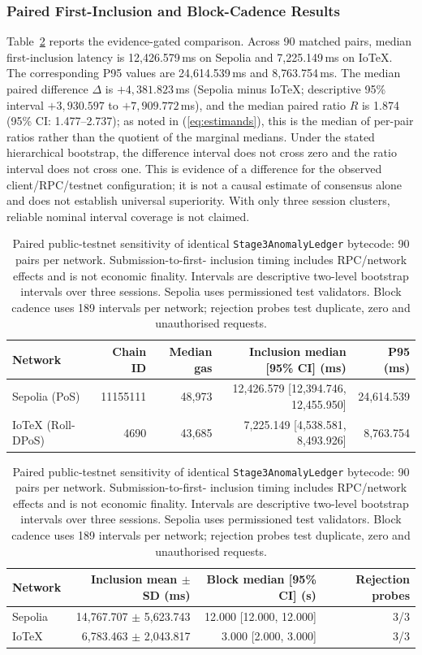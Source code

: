 \documentclass[journal]{IEEEtran}
\newif\ifshowrevisions
\newcommand{\rev}[1]{{\ifshowrevisions\color{blue}\else\color{black}\fi #1}}
\begin{document}
\subsubsection{Paired First-Inclusion and Block-Cadence Results}
Table~\ref{tab:paired} reports the evidence-gated comparison. Across 90
matched pairs, median first-inclusion latency is 12{,}426.579\,ms on Sepolia
and 7{,}225.149\,ms on IoTeX. The corresponding P95 values are
24{,}614.539\,ms and 8{,}763.754\,ms. The median paired difference $\Delta$ is
$+4{,}381.823$\,ms (Sepolia minus IoTeX; descriptive 95\% interval
$+3{,}930.597$ to $+7{,}909.772$\,ms), and the
median paired ratio $R$ is 1.874 (95\% CI: 1.477--2.737); as noted in
(\ref{eq:estimands}), this is the median of per-pair ratios rather than the
quotient of the marginal medians. Under the stated hierarchical bootstrap, the
difference interval does not cross zero and the ratio interval does not cross
one. This is evidence of a difference for the observed client/RPC/testnet
configuration; it is not a causal estimate of consensus alone and does not
establish universal superiority. With only three session clusters, reliable
nominal interval coverage is not claimed.
\begin{table}[!t]
\centering\ifshowrevisions\color{blue}\else\color{black}\fi\footnotesize
\caption{\rev{Paired public-testnet sensitivity of identical
\texttt{Stage3AnomalyLedger} bytecode: 90 pairs per network. Submission-to-first-
inclusion timing includes RPC/network effects and is not economic finality.
Intervals are descriptive two-level bootstrap intervals over three sessions.
Sepolia uses permissioned test validators. Block cadence uses 189 intervals
per network; rejection probes test duplicate, zero and unauthorised requests.}}
\label{tab:paired}
\begin{tabular}{lrrrr}
\toprule
Network & Chain ID & Median gas & Inclusion median [95\% CI] (ms) & P95 (ms) \\
\midrule
Sepolia (PoS) & 11155111 & 48{,}973 &
12{,}426.579 [12{,}394.746, 12{,}455.950] & 24{,}614.539 \\
IoTeX (Roll-DPoS) & 4690 & 43{,}685 &
7{,}225.149 [4{,}538.581, 8{,}493.926] & 8{,}763.754 \\
\bottomrule
\end{tabular}
\par\smallskip
\begin{tabular}{lrrr}
\toprule
Network & Inclusion mean $\pm$ SD (ms) & Block median [95\% CI] (s) & Rejection probes \\
\midrule
Sepolia & 14{,}767.707 $\pm$ 5{,}623.743 & 12.000 [12.000, 12.000] & 3/3 \\
IoTeX & 6{,}783.463 $\pm$ 2{,}043.817 & 3.000 [2.000, 3.000] & 3/3 \\
\bottomrule
\end{tabular}
\end{table}
\end{document}
